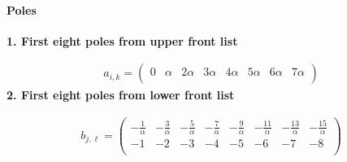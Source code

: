 \documentclass[11pt]{article}
\begin{document}
\paragraph{Poles}

\noindent\textbf{1. First eight poles from upper front list}

\begin{align*}
  a_{i,k} = 
  \left(
\begin{array}{cccccccc}
 0 & \alpha  & 2 \alpha  & 3 \alpha  & 4 \alpha  & 5 \alpha  & 6 \alpha  & 7 \alpha  \\
\end{array}
\right)
\end{align*}
\noindent\textbf{2. First eight poles from lower front list}

\begin{align*}
  b_{j,\ell} = 
  \left(
\begin{array}{cccccccc}
 -\frac{1}{\alpha } & -\frac{3}{\alpha } & -\frac{5}{\alpha } & -\frac{7}{\alpha } & -\frac{9}{\alpha } & -\frac{11}{\alpha } & -\frac{13}{\alpha } & -\frac{15}{\alpha } \\
 -1 & -2 & -3 & -4 & -5 & -6 & -7 & -8 \\
\end{array}
\right)
\end{align*}

\printbibliography[title={References}]
\end{document}
